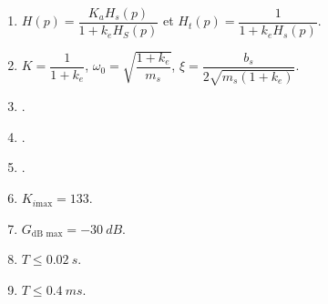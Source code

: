 \begin{multicols}{2}
\footnotesize
\begin{enumerate}
\item $H(p)=\dfrac{K_aH_s(p)}{1+k_e H_S(p)}$ et $H_t(p)=\dfrac{1}{1+k_e H_s(p)}$.
\item $K=\dfrac{1}{1+k_e}$, $\omega_0=\sqrt{\dfrac{1+k_e}{m_s}}$, $\xi=\dfrac{b_s}{2\sqrt{m_s\left(1+k_e\right)}}$.
\item .
\item .
\item .
\item $K_{i \text{max}} = 133$.
\item $G_{\text{dB max} } = -\SI{30}{dB} $.
\item $T\leq \SI{0,02}{s}$.
\item $T\leq \SI{0,4}{ms}$.
\end{enumerate}

\normalsize
\end{multicols}

\begin{center}
\end{center}
%
%
%
%